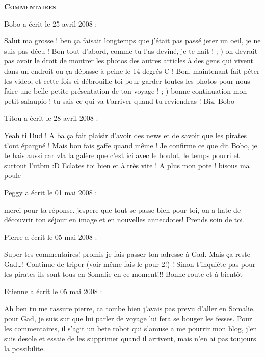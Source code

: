 \bigskip
\textbf{\textsc{Commentaires}}

\medskip
Bobo a écrit le 25 avril 2008 :
\begin{displayquote}
Salut ma grosse ! ben ça faisait longtemps que j'était pas passé jeter un oeil, je ne suis pas décu !
Bon tout d'abord, comme tu l'as deviné, je te hait ! ;-) on devrait pas avoir le droit de montrer les photos des autres articles à des gens qui vivent dans un endroit ou ça dépasse à peine le 14 degrés C !
Bon, maintenant fait péter les video, et cette fois ci débrouille toi pour garder toutes les photos pour nous faire une belle petite présentation de ton voyage ! ;-)
bonne continuation mon petit salaupio ! tu sais ce qui va t'arriver quand tu reviendras !
Biz, Bobo
\end{displayquote}

\medskip
Titou a écrit le 28 avril 2008 :
\begin{displayquote}
Yeah ti Dud !
A ba ça fait plaisir d'avoir des news et de savoir que les pirates t'ont épargné ! Mais bon fais gaffe quand même !
Je confirme ce que dit Bobo, je te hais aussi car vla la galère que c'est ici avec le boulot, le temps pourri et surtout l'utbm :D Eclates toi bien et à très vite !
A plus mon pote !
bisous ma poule
\end{displayquote}

\medskip
Peggy a écrit le 01 mai 2008 :
\begin{displayquote}
merci pour ta réponse. jespere que tout se passe bien pour toi, on a hate de découvrir ton séjour en image et en nouvelles annecdotes!
Prends soin de toi.
\end{displayquote}

\medskip
Pierre a écrit le 05 mai 2008 :
\begin{displayquote}
Super tes commentaires!
promis je fais passer ton adresse à Gad.
Mais ça reste Gad\dots!
Continue de triper (voir même fais le pour 2!) !
Sinon t'inquiète pas pour les pirates ils sont tous en Somalie en ce moment!!!
Bonne route et à bientôt
\end{displayquote}

\medskip
Etienne a écrit le 05 mai 2008 :
\begin{displayquote}
Ah ben tu me rassure pierre, ca tombe bien j'avais pas prevu d'aller en Somalie, pour Gad, je suis sur que lui parler de voyage lui fera se bouger les fesses.
Pour les commentaires, il s'agit un bete robot qui s'amuse a me pourrir mon blog, j'en suis desole et essaie de les supprimer quand il arrivent, mais n'en ai pas toujours la possibilite.
\end{displayquote}

